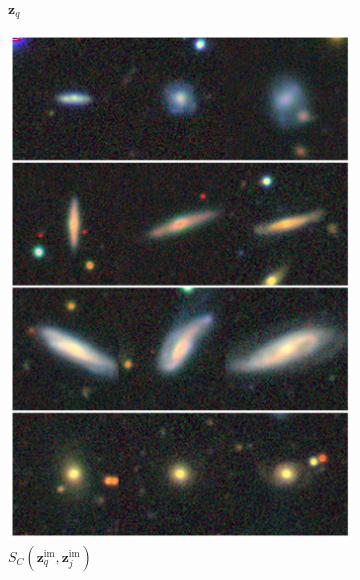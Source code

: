 \documentclass[a4paper,12pt]{article}
\begin{document}
\begin{figure}[H]
\begin{subfigure}{0.08\textwidth}
        \caption{$\mathbf{z}_q$}
        \label{fig:retrieval_1}
    \end{subfigure}%
    \hfill
    \begin{subfigure}{0.22\textwidth}
        \centering
        \includegraphics[height=0.21\textheight]{../figures/images_im_im.png}
        \caption{$S_C(\mathbf{z}_q^{\text{im}}, \mathbf{z}_j^{\text{im}})$}
        \label{fig:retrieval_2}
    \end{subfigure}%
    \hfill
    \begin{subfigure}{0.22\textwidth}
        \centering

\end{subfigure}
\end{figure}
\end{document}
